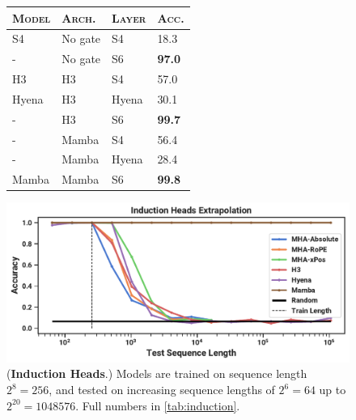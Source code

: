 \begin{figure}
  \begin{minipage}{0.33\linewidth}
    \iftoggle{arxiv}{\small}{\footnotesize}
    \centering
    \begin{tabular}{@{}llll@{}}
      \toprule
      \textsc{Model}          & \textsc{Arch.}        & \textsc{Layer}      & \textsc{Acc.} \\
      \midrule
      S4                       & No gate               & S4                  & 18.3 \\
      -                       & No gate               & S6                  & \textbf{97.0} \\
      \midrule
      H3                      & H3                    & S4                  & 57.0 \\
      Hyena                   & H3                    & Hyena               & 30.1 \\
      -                       & H3                    & S6                  & \textbf{99.7} \\
      \midrule
      -                       & Mamba                 & S4                  & 56.4 \\
      -                       & Mamba                 & Hyena               & 28.4 \\
      Mamba                   & Mamba                 & S6                  & \textbf{99.8} \\
      \bottomrule
    \end{tabular}
    \iftoggle{arxiv}{
      \captionsetup{type=table,skip=12pt}
    }{
      \captionsetup{type=table,skip=12pt}
    }
    \caption{
      (\textbf{Selective Copying}.) \\
      Accuracy for combinations of architectures and inner sequence layers.
    }
    \label{tab:copying}
  \end{minipage}
  \hfill
  \begin{minipage}{\iftoggle{arxiv}{0.55\linewidth}{0.63\linewidth}}
    \centering
    \includegraphics[width=\linewidth]{fig/induction.pdf}
    \iftoggle{arxiv}{
      \captionsetup{type=table,skip=-6pt}
    }{
      \captionsetup{type=figure,skip=-12pt}
    }
    \caption{
      (\textbf{Induction Heads}.)
      Models are trained on sequence length $2^8=256$, and tested on increasing sequence lengths of $2^6=64$ up to $2^{20}=1048576$.
      Full numbers in \cref{tab:induction}.
    }
    \label{fig:induction}
  \end{minipage}
\end{figure}


